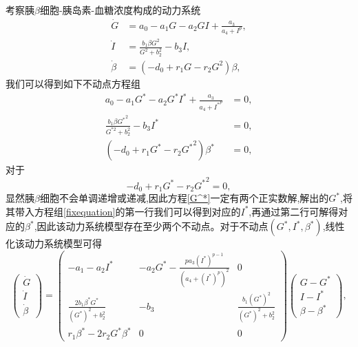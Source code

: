 考察胰$\beta$细胞-胰岛素-血糖浓度构成的动力系统
\begin{equation}
    \begin{aligned}
        \dot{G}     & = a_0-a_1G-a_2GI+\frac{a_3}{a_4+I^p} ,      \\
        \dot{I}     & = \frac{b_1\beta G^2}{G^2 + b_2^2} - b_3 I ,\\
        \dot{\beta} & = (-d_0+r_1G-r_2G^2)\beta,
    \end{aligned}
\end{equation}
我们可以得到如下不动点方程组
\begin{equation}\label{fixequation}
    \begin{aligned}
        a_0-a_1G^*-a_2G^*I^*+\frac{a_3}{a_4+{I^*}^p}     & =0, \\
        \frac{b_1\beta {G^*}^2}{G^{*2} + b_2^2} - b_3I^* & =0, \\
        (-d_0+r_1G^*-r_2{G^*}^2)\beta^*                  & =0,
    \end{aligned}
\end{equation}
对于
\begin{equation}\label{G^*}
    -d_0+r_1G^*-r_2{G^*}^2=0,
\end{equation}
显然胰$\beta$细胞不会单调递增或递减,因此方程\ref{G^*}一定有两个正实数解,解出的$G^*$,将其带入方程组\ref{fixequation}的第一行我们可以得到对应的$I^*$,再通过第二行可解得对应的$\beta^*$,因此该动力系统模型存在至少两个不动点。对于不动点$(G^*,I^*,\beta^*)$,线性化该动力系统模型可得
\begin{equation}\label{linear}
    \begin{pmatrix}
        \dot{G} \\
        \dot{I} \\
        \dot{\beta}
    \end{pmatrix}=\begin{pmatrix}
        -a_1-a_2I^*                            & -a_2G^*-\frac{pa_3(I^*)^{p-1}}{(a_4+(I^*)^p)^2} & 0                                  \\
        \frac{2b_1\beta^*G^*}{(G^*)^2 + b_2^2} & -b_3                                            & \frac{b_1(G^*)^2}{(G^*)^2 + b_2^2} \\
        r_1\beta^*-2r_2G^*\beta^*              & 0                                               & 0
    \end{pmatrix}\begin{pmatrix}
        G-G^* \\
        I-I^* \\
        \beta-\beta^*
    \end{pmatrix},
\end{equation}

